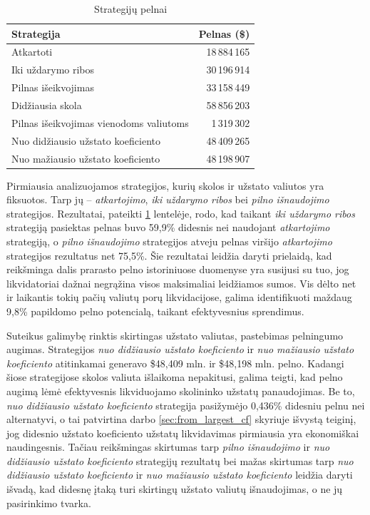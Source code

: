 \documentclass[]{VUMIFTemplateClass}
\begin{document}
\begin{table}[h!]
  \centering
  \caption{Strategijų pelnai}
  \label{tab:strategiju_pelnai}
  \begin{tabular}{|l|r|}
  \hline
  \textbf{Strategija} & \textbf{Pelnas (\$)} \\ \hline
  Atkartoti                               & 18\,884\,165 \\ \hline
  Iki uždarymo ribos                      & 30\,196\,914 \\ \hline
  Pilnas išeikvojimas                     & 33\,158\,449 \\ \hline
  Didžiausia skola                        & 58\,856\,203 \\ \hline
  Pilnas išeikvojimas vienodoms valiutoms & 1\,319\,302  \\ \hline
  Nuo didžiausio užstato koeficiento      & 48\,409\,265 \\ \hline
  Nuo mažiausio užstato koeficiento       & 48\,198\,907 \\ \hline
  \end{tabular}
  \end{table}

Pirmiausia analizuojamos strategijos, kurių skolos ir užstato valiutos yra fiksuotos. Tarp jų – \textit{atkartojimo}, \textit{iki uždarymo ribos} bei \textit{pilno išnaudojimo} strategijos. Rezultatai, pateikti \ref{tab:strategiju_pelnai} lentelėje, rodo, kad taikant \textit{iki uždarymo ribos} strategiją pasiektas pelnas buvo 59,9\% didesnis nei naudojant \textit{atkartojimo} strategiją, o \textit{pilno išnaudojimo} strategijos atveju pelnas viršijo \textit{atkartojimo} strategijos rezultatus net 75,5\%. Šie rezultatai leidžia daryti prielaidą, kad reikšminga dalis prarasto pelno istoriniuose duomenyse yra susijusi su tuo, jog likvidatoriai dažnai negrąžina visos maksimaliai leidžiamos sumos. Vis dėlto net ir laikantis tokių pačių valiutų porų likvidacijose, galima identifikuoti maždaug 9,8\% papildomo pelno potencialą, taikant efektyvesnius sprendimus.

Suteikus galimybę rinktis skirtingas užstato valiutas, pastebimas pelningumo augimas. Strategijos \textit{nuo didžiausio užstato koeficiento} ir \textit{nuo mažiausio užstato koeficiento} atitinkamai generavo \$48,409 mln. ir \$48,198 mln. pelno. Kadangi šiose strategijose skolos valiuta išlaikoma nepakitusi, galima teigti, kad pelno augimą lėmė efektyvesnis likviduojamo skolininko užstatų panaudojimas. Be to, \textit{nuo didžiausio užstato koeficiento} strategija pasižymėjo 0,436\% didesniu pelnu nei alternatyvi, o tai patvirtina darbo \ref{sec:from_largest_cf} skyriuje išvystą teiginį, jog didesnio užstato koeficiento užstatų likvidavimas pirmiausia yra ekonomiškai naudingesnis. Tačiau reikšmingas skirtumas tarp \textit{pilno išnaudojimo} ir \textit{nuo didžiausio užstato koeficiento} strategijų rezultatų bei mažas skirtumas tarp \textit{nuo didžiausio užstato koeficiento} ir \textit{nuo mažiausio užstato koeficiento} leidžia daryti išvadą, kad didesnę įtaką turi skirtingų užstato valiutų išnaudojimas, o ne jų pasirinkimo tvarka.
\end{document}
